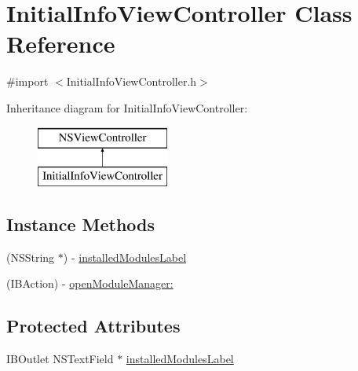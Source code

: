 \hypertarget{interface_initial_info_view_controller}{\section{Initial\-Info\-View\-Controller Class Reference}
\label{interface_initial_info_view_controller}
}


{\ttfamily \#import $<$Initial\-Info\-View\-Controller.\-h$>$}

Inheritance diagram for Initial\-Info\-View\-Controller\-:\begin{figure}[H]
\begin{center}
\leavevmode
\includegraphics[height=2.000000cm]{interface_initial_info_view_controller}
\end{center}
\end{figure}
\subsection*{Instance Methods}
\begin{DoxyCompactItemize}
\item 
(N\-S\-String $\ast$) -\/ \hyperlink{interface_initial_info_view_controller_a8addb083b2379c79c90d6bef17c74884}{installed\-Modules\-Label}
\item 
(I\-B\-Action) -\/ \hyperlink{interface_initial_info_view_controller_a712280d98ea56773b783705e1d438c75}{open\-Module\-Manager\-:}
\end{DoxyCompactItemize}
\subsection*{Protected Attributes}
\begin{DoxyCompactItemize}
\item 
I\-B\-Outlet N\-S\-Text\-Field $\ast$ \hyperlink{interface_initial_info_view_controller_a344b7e7e9d23e2698f459f210c9ebefa}{installed\-Modules\-Label}
\end{DoxyCompactItemize}


